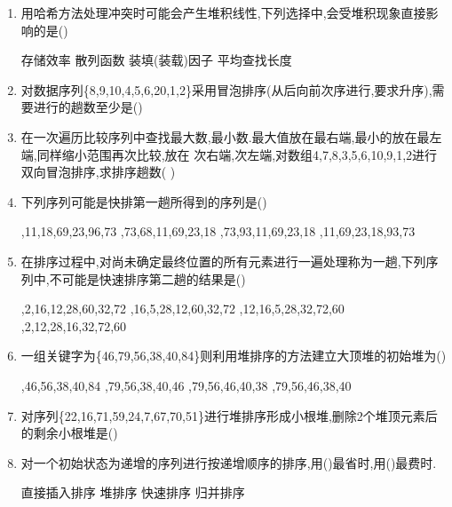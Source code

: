 \documentclass[12pt, a4paper, oneside, UTF8]{ctexbook}
\begin{document}
\begin{enumerate}
    \item \bl 用哈希方法处理冲突时可能会产生堆积线性,下列选择中,会受堆积现象直接影响的是()
    \begin{choices}
        \task 存储效率
        \task 散列函数
        \task 装填(装载)因子
        \task 平均查找长度 
    \end{choices}

    \item 对数据序列\{8,9,10,4,5,6,20,1,2\}采用冒泡排序(从后向前次序进行,要求升序),需要进行的趟数至少是() 
    

    \item 在一次遍历比较序列中查找最大数,最小数.最大值放在最右端,最小的放在最左端,同样缩小范围再次比较,放在
    次右端,次左端,对数组4,7,8,3,5,6,10,9,1,2进行双向冒泡排序,求排序趟数(   ) 

    \item 下列序列可能是快排第一趟所得到的序列是() 
    \begin{choices}[2]
        ,11,18,69,23,96,73 ,73,68,11,69,23,18
        ,73,93,11,69,23,18 ,11,69,23,18,93,73
    \end{choices}

    \item 在排序过程中,对尚未确定最终位置的所有元素进行一遍处理称为一趟,下列序列中,不可能是快速排序第二趟的结果是() 
    \begin{choices}[2]
        ,2,16,12,28,60,32,72
        ,16,5,28,12,60,32,72
        ,12,16,5,28,32,72,60
        ,2,12,28,16,32,72,60
    \end{choices}

    \item 一组关键字为\{46,79,56,38,40,84\}则利用堆排序的方法建立大顶堆的初始堆为()
    \begin{choices}[2]
        ,46,56,38,40,84
        ,79,56,38,40,46
        ,79,56,46,40,38
        ,79,56,46,38,40
    \end{choices}

    \item 对序列\{22,16,71,59,24,7,67,70,51\}进行堆排序形成小根堆,删除2个堆顶元素后的剩余小根堆是() 

    \item 对一个初始状态为递增的序列进行按递增顺序的排序,用()最省时,用()最费时. 
    \begin{choices}
        \task 直接插入排序 \task 堆排序 \task 快速排序 \task 归并排序 
    \end{choices}


\end{enumerate}
\end{document}
